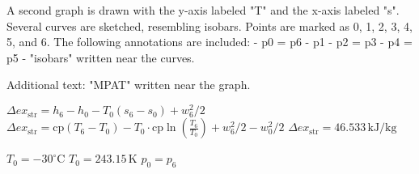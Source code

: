 A second graph is drawn with the y-axis labeled "T" and the x-axis labeled "s". Several curves are sketched, resembling isobars. Points are marked as 0, 1, 2, 3, 4, 5, and 6. The following annotations are included:  
- p0 = p6  
- p1  
- p2 = p3  
- p4 = p5  
- "isobars" written near the curves.  

Additional text: "MPAT" written near the graph.

\( \Delta ex_{\text{str}} = h_6 - h_0 - T_0 (s_6 - s_0) + w_6^2 / 2 \)  
\( \Delta ex_{\text{str}} = \text{cp} (T_6 - T_0) - T_0 \cdot \text{cp} \ln \left( \frac{T_6}{T_0} \right) + w_6^2 / 2 - w_0^2 / 2 \)  
\( \Delta ex_{\text{str}} = 46.533 \, \text{kJ/kg} \)  

\( T_0 = -30^\circ \text{C} \)  
\( T_0 = 243.15 \, \text{K} \)  
\( p_0 = p_6 \)